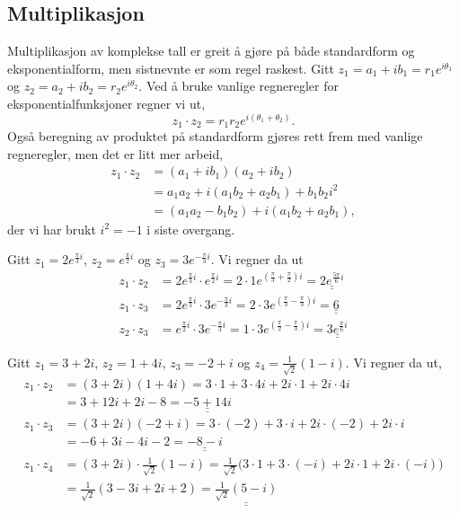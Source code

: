 \documentclass[a4paper,norsk,12pt]{article}
\newcommand{\ans}[1]{\underline{\underline{#1}}}
\newcounter{exa}
\begin{document}
\subsection{Multiplikasjon}
Multiplikasjon av komplekse tall er greit å gjøre på både standardform og eksponentialform, men sistnevnte er som regel raskest. Gitt $z_1 = a_1 + ib_1 = r_1e^{i\theta_1}$ og $z_2 = a_2+ib_2 = r_2e^{i\theta_2}$. Ved å bruke vanlige regneregler for eksponentialfunksjoner regner vi ut,
\begin{displaymath}
	z_1\cdot z_2 = r_1r_2e^{i(\theta_1+\theta_2)}.
\end{displaymath}
Også beregning av produktet på standardform gjøres rett frem med vanlige regneregler, men det er litt mer arbeid,
\begin{align*}
	z_1\cdot z_2 &= (a_1+ib_1)(a_2+ib_2) \\
		&= a_1a_2 + i(a_1b_2+a_2b_1)+b_1b_2i^2 \\
		&= (a_1a_2-b_1b_2) + i (a_1b_2+a_2b_1),
\end{align*}
der vi har brukt $i^2=-1$ i siste overgang.
\begin{texample}
Gitt $z_1 = 2e^{\frac{\pi}{3}i}$, $z_2 = e^{\frac{\pi}{2}i}$ og $z_3 = 3e^{-\frac{\pi}{3}i}$. Vi regner da ut
\begin{align*}
	z_1\cdot z_2 &= 2e^{\frac{\pi}{3}i}\cdot e^{\frac{\pi}{2}i} = 2\cdot1 e^{\left(\frac{\pi}{3}+\frac{\pi}{2}\right)i} = \ans{2e^{\frac{5\pi}{6}i}} \\
	z_1\cdot z_3 &= 2e^{\frac{\pi}{3}i}\cdot 3e^{-\frac{\pi}{3}i} = 2\cdot3 e^{\left(\frac{\pi}{3}-\frac{\pi}{3}\right)i} = \ans{6} \\
	z_2\cdot z_3 &= e^{\frac{\pi}{2}i}\cdot 3e^{-\frac{\pi}{3}i} = 1\cdot3e^{\left(\frac{\pi}{2}-\frac{\pi}{3}\right)i} = \ans{3e^{\frac{\pi}{6}i}}
\end{align*}
\end{texample}

\begin{texample}
Gitt $z_1 = 3 + 2i$, $z_2=1 + 4i$, $z_3 = -2 + i$ og $z_4 = \frac{1}{\sqrt{2}}(1-i)$. Vi regner da ut,
\begin{align*}
	z_1\cdot z_2 &= (3+2i)(1+4i) = 3\cdot1 + 3\cdot4i + 2i\cdot1 + 2i\cdot 4i \\
	&= 3 +12i+2i -8 = \ans{-5+14i} \\[12pt]
	z_1\cdot z_3 &= (3+2i)(-2+i) = 3\cdot(-2)+3\cdot i+2i\cdot(-2) + 2i\cdot i \\
	&= -6 + 3i -4i -2 = \ans{-8 -i} \\[12pt]
	z_1\cdot z_4 &= (3+2i)\cdot\frac{1}{\sqrt{2}}(1-i) = \frac{1}{\sqrt{2}} \Big(3\cdot 1 + 3\cdot(-i) + 2i\cdot1 + 2i\cdot(-i) \Big)\\
	&= \frac{1}{\sqrt{2}}\left(3-3i+2i+2\right) = \ans{\frac{1}{\sqrt{2}}(5-i)}
\end{align*} 	
\end{texample}
\end{document}
